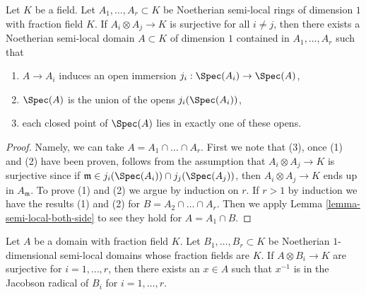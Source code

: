 \begin{lemma}
\label{lemma-glue-a-bunch-of-local-rings}
Let $K$ be a field. Let $A_1, \ldots, A_r \subset K$ be Noetherian
semi-local rings of dimension $1$ with fraction field $K$. If
$A_i \otimes A_j \to K$ is surjective for all $i \not = j$, then
there exists a Noetherian semi-local domain $A \subset K$
of dimension $1$ contained in $A_1, \ldots, A_r$ such that
\begin{enumerate}
\item $A \to A_i$ induces an open immersion $j_i : \Spec(A_i) \to \Spec(A)$,
\item $\Spec(A)$ is the union of the opens $j_i(\Spec(A_i))$,
\item each closed point of $\Spec(A)$ lies in exactly one of these
opens.
\end{enumerate}
\end{lemma}

\begin{proof}
Namely, we can take $A = A_1 \cap \ldots \cap A_r$. First we note that (3),
once (1) and (2) have been proven, follows from the assumption that
$A_i \otimes A_j \to K$ is surjective since if
$\mathfrak m \in j_i(\Spec(A_i)) \cap j_j(\Spec(A_j))$, then
$A_i \otimes A_j \to K$ ends up in $A_\mathfrak m$.
To prove (1) and (2) we argue by induction on $r$.
If $r > 1$ by induction we have the results (1) and (2) for
$B = A_2 \cap \ldots \cap A_r$. Then we apply
Lemma \ref{lemma-semi-local-both-side} to see they hold for
$A = A_1 \cap B$.
\end{proof}

\begin{lemma}
\label{lemma-create-globally-generated}
Let $A$ be a domain with fraction field $K$. Let $B_1, \ldots, B_r \subset K$
be Noetherian $1$-dimensional semi-local domains whose fraction
fields are $K$. If $A \otimes B_i \to K$ are surjective for $i = 1, \ldots, r$,
then there exists an $x \in A$ such that $x^{-1}$ is in the Jacobson radical of
$B_i$ for $i = 1, \ldots, r$.
\end{lemma}

